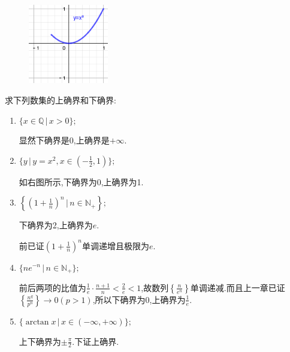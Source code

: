 \documentclass[cn,chinese,fontset]{elegantbook}
\begin{document}
            \begin{figure}
                \includegraphics[width=3.5cm]{第三章 实数系的基本定理/3.1 确界的概念和确界存在定理/图一.png}
                \caption{}
            \end{figure}
            \begin{exercise}
                求下列数集的上确界和下确界:
                \begin{enumerate}
                    \item $\{x\in \mathbb{Q}\,\lvert\, x>0\};$
                    \begin{solution}
                        显然下确界是0,上确界是$+\infty$.
                    \end{solution}
                    \item $\{y\,\lvert\, y=x^2,x\in(-\frac{1}{2},1)\};$
                    \begin{solution}
                        如右图所示,下确界为0,上确界为1.
                    \end{solution}
                    \item $\left\{\left(1+\frac{1}{n}\right)^n \,\bigg\lvert\, n\in \mathbb{N}_+\right\};$
                    \begin{solution}
                        下确界为2,上确界为$e$.
            
                        前已证$\left(1+\frac{1}{n}\right)^n$单调递增且极限为$e$.
                    \end{solution}
                    \item $\{ne^{-n}\,\lvert\, n\in \mathbb{N}_+\};$
                    \begin{solution}
                        前后两项的比值为$\frac{1}{e}\cdot\frac{n+1}{n}<\frac{2}{e}<1$,故数列$\left\{\frac{n}{e^n}\right\}$单调递减.而且上一章已证$\left\{\frac{n^q}{p^n}\right\}\to 0(p>1)$,所以下确界为0,上确界为$\frac{1}{e}$.
                    \end{solution}
                    \item $\{\arctan x \,\lvert\, x\in (-\infty,+\infty)\};$
                    \begin{solution}
                        上下确界为$\pm \frac{\pi}{2}$.下证上确界.
            

\end{solution}
\end{enumerate}
\end{exercise}
\end{document}
